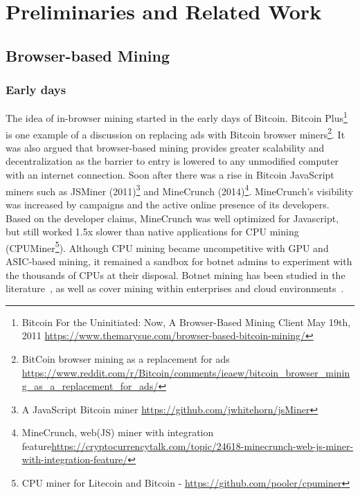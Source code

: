 %
%
%
%
%
%

\section{Preliminaries and Related Work}

\subsection{Browser-based Mining}

\subsubsection{Early days}
The idea of in-browser mining started in the early days of Bitcoin. Bitcoin Plus\footnote{Bitcoin For the Uninitiated: Now, A Browser-Based Mining Client  May 19th, 2011 \url{https://www.themarysue.com/browser-based-bitcoin-mining/}} is one example of a discussion on replacing ads with Bitcoin browser miners\footnote{BitCoin browser mining as a replacement for ads \url{https://www.reddit.com/r/Bitcoin/comments/ieaew/bitcoin_browser_mining_as_a_replacement_for_ads/}}. It was also argued that browser-based mining provides greater scalability and decentralization as the barrier to entry is lowered to any unmodified computer with an internet connection. Soon after there was a rise in Bitcoin JavaScript miners such as JSMiner (2011)\footnote{A JavaScript Bitcoin miner \url{https://github.com/jwhitehorn/jsMiner}} and MineCrunch (2014)\footnote{MineCrunch, web(JS) miner with integration feature\url{https://cryptocurrencytalk.com/topic/24618-minecrunch-web-js-miner-with-integration-feature/}}. MineCrunch's visibility was increased by campaigns and the active online presence of its developers. Based on the developer claims, MineCrunch was well optimized for Javascript, but still worked 1.5x slower than native applications for CPU mining (\eg CPUMiner\footnote{CPU miner for Litecoin and Bitcoin - \url{https://github.com/pooler/cpuminer}}). Although CPU mining became uncompetitive with GPU and ASIC-based mining, it remained a sandbox for botnet admins to experiment with the thousands of CPUs at their disposal. Botnet mining has been studied in the literature~\cite{huang2014botcoin,wyke2012zeroaccess}, as well as cover mining within enterprises and cloud environments~\cite{MiningonSOeDime2017}.

